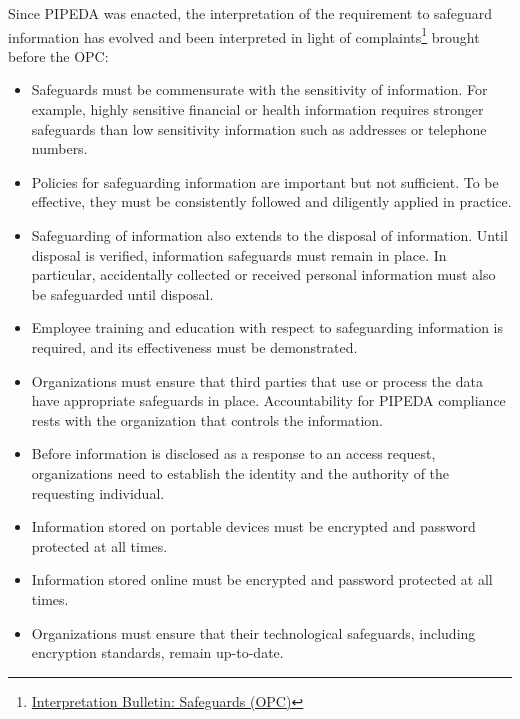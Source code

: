 Since PIPEDA was enacted, the interpretation of the requirement to safeguard information has evolved and been interpreted in light of complaints\footnote{\href{https://www.priv.gc.ca/en/privacy-topics/privacy-laws-in-canada/the-personal-information-protection-and-electronic-documents-act-pipeda/pipeda-compliance-help/pipeda-interpretation-bulletins/interpretations_08_sg/}{Interpretation Bulletin: Safeguards (OPC)}} brought before the OPC:
\begin{itemize}
  \item Safeguards must be commensurate with the sensitivity of information. For example, highly sensitive financial or health information requires stronger safeguards than low sensitivity information such as addresses or telephone numbers. 
  \item Policies for safeguarding information are important but not sufficient. To be effective, they must be consistently followed and diligently applied in practice. 
  \item Safeguarding of information also extends to the disposal of information. Until disposal is verified, information safeguards must remain in place. In particular, accidentally collected or received personal information must also be safeguarded until disposal. 
  \item Employee training and education with respect to safeguarding information is required, and its effectiveness must be demonstrated.
  \item Organizations must ensure that third parties that use or process the data have appropriate safeguards in place. Accountability for PIPEDA compliance rests with the organization that controls the information. 
  \item Before information is disclosed as a response to an access request, organizations need to establish the identity and the authority of the requesting individual. 
  \item Information stored on portable devices must be encrypted and password protected at all times.
  \item Information stored online must be encrypted and password protected at all times.
  \item Organizations must ensure that their technological safeguards, including encryption standards, remain up-to-date. 
\end{itemize}

